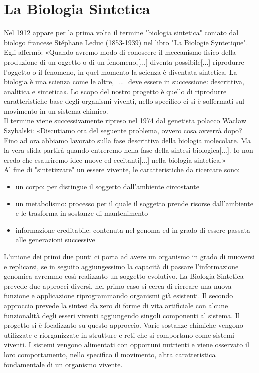 \section{La Biologia Sintetica}
\label{sec:artificial}
Nel 1912 appare per la prima volta il termine "biologia sintetica" coniato dal biologo francese Stéphane Leduc (1853-1939) nel libro "La Biologie Syntetique". Egli affermò: «Quando avremo modo di conoscere il meccanismo fisico della produzione di un oggetto o di un fenomeno,[...] diventa possibile[...] riprodurre l'oggetto o il fenomeno, in quel momento la scienza è diventata sintetica. La biologia è una scienza come le altre, [...] deve essere in successione: descrittiva, analitica e sintetica». 
Lo scopo del nostro progetto è  quello di riprodurre caratteristiche base degli organismi viventi, nello specifico ci si è soffermati sul movimento in un sistema chimico.
\\Il termine viene successivamente ripreso nel 1974 dal genetista polacco Wacław Szybalski: «Discutiamo ora del seguente problema, ovvero cosa avverrà dopo? Fino ad ora abbiamo lavorato sulla fase descrittiva della biologia molecolare. Ma la vera sfida partirà quando entreremo nella fase della sintesi biologica[...]. Io non credo che esauriremo idee nuove ed eccitanti[...] nella biologia sintetica.» \cite{waclaw} 
\\Al fine di "sintetizzare" un essere vivente, le caratteristiche da ricercare sono:
\begin{itemize}
\item un corpo: per distingue il soggetto dall'ambiente circostante
\item un metabolismo: processo per il quale il soggetto prende risorse dall'ambiente e le trasforma in sostanze di mantenimento
\item informazione ereditabile: contenuta nel genoma ed in grado di essere passata alle generazioni successive
\end{itemize}
L'unione dei primi due punti ci porta ad avere un organismo in grado di muoversi e replicarsi, se in seguito aggiungessimo la capacità di passare l'informazione genomica avremmo così realizzato un soggetto evolutivo.
La Biologia Sintetica prevede due approcci diversi, nel primo caso si cerca di ricreare una nuova funzione e applicazione riprogrammando organismi già esistenti. Il secondo approccio prevede la sintesi da zero di forme di vita artificiale con alcune funzionalità degli esseri viventi aggiungendo singoli componenti al sistema. Il progetto si è focalizzato su questo approccio. Varie sostanze chimiche vengono utilizzate e riorganizzate in strutture e reti che si comportano come sistemi viventi. I sistemi vengono alimentati con opportuni nutrienti e viene osservato il loro comportamento, nello specifico il movimento, altra caratteristica fondamentale di un organismo vivente.
\pagebreak
